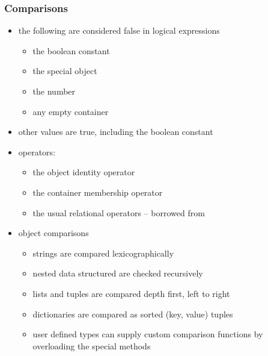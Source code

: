%
%


\begin{frame}[fragile]
%
  \frametitle{Comparisons}
%
  \begin{itemize}
%
  \item the following are considered false in logical expressions
    \begin{itemize}
    \item the boolean constant 
    \item the special object 
    \item the number 
    \item any empty container
    \end{itemize}
%
  \item other values are true, including the boolean constant 
%
  \item operators:
    \begin{itemize}
    \item the object identity operator 
    \item the container membership operator 
    \item the usual relational operators -- borrowed from \cc
    \end{itemize}
%
  \item object comparisons
    \begin{itemize}
    \item strings are compared lexicographically
    \item nested data structured are checked recursively
    \item lists and tuples are compared depth first, left to right
    \item dictionaries are compared as sorted (key, value) tuples
    \item user defined types can supply custom comparison functions by overloading the special
      methods
    \end{itemize}
%
  \end{itemize}
%
\end{frame}

